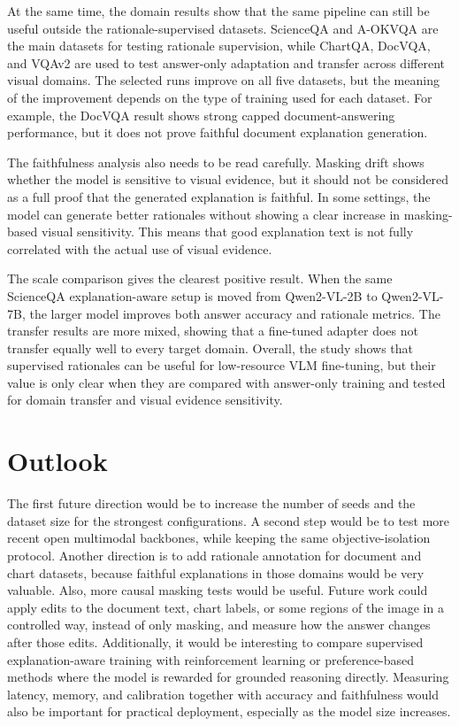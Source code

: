 At the same time, the domain results show that the same pipeline can still be useful outside the rationale-supervised datasets.
ScienceQA and A-OKVQA are the main datasets for testing rationale supervision, while ChartQA, DocVQA, and VQAv2 are used to test answer-only adaptation and transfer across different visual domains.
The selected runs improve on all five datasets, but the meaning of the improvement depends on the type of training used for each dataset.
For example, the DocVQA result shows strong capped document-answering performance, but it does not prove faithful document explanation generation.

The faithfulness analysis also needs to be read carefully.
Masking drift shows whether the model is sensitive to visual evidence, but it should not be considered as a full proof that the generated explanation is faithful.
In some settings, the model can generate better rationales without showing a clear increase in masking-based visual sensitivity.
This means that good explanation text is not fully correlated with the actual use of visual evidence.

The scale comparison gives the clearest positive result.
When the same ScienceQA explanation-aware setup is moved from Qwen2-VL-2B to Qwen2-VL-7B, the larger model improves both answer accuracy and rationale metrics.
The transfer results are more mixed, showing that a fine-tuned adapter does not transfer equally well to every target domain.
Overall, the study shows that supervised rationales can be useful for low-resource VLM fine-tuning, but their value is only clear when they are compared with answer-only training and tested for domain transfer and visual evidence sensitivity.

\section{Outlook}
The first future direction would be to increase the number of seeds and the dataset size for the strongest configurations.
A second step would be to test more recent open multimodal backbones, while keeping the same objective-isolation protocol.
Another direction is to add rationale annotation for document and chart datasets, because faithful explanations in those domains would be very valuable.
Also, more causal masking tests would be useful.
Future work could apply edits to the document text, chart labels, or some regions of the image in a controlled way, instead of only masking, and measure how the answer changes after those edits.
Additionally, it would be interesting to compare supervised explanation-aware training with reinforcement learning or preference-based methods where the model is rewarded for grounded reasoning directly.
Measuring latency, memory, and calibration together with accuracy and faithfulness would also be important for practical deployment, especially as the model size increases.

